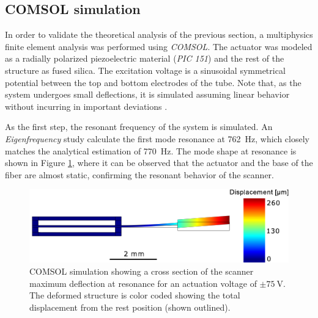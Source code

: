 \documentclass[10pt]{iopart}
\begin{document}
\subsection{COMSOL simulation}

In order to validate the theoretical analysis of the previous section, a multiphysics finite element analysis was performed using \textit{COMSOL}. The actuator was modeled as a radially polarized piezoelectric material (\textit{PIC 151}) and the rest of the structure as fused silica. The excitation voltage is a sinusoidal symmetrical potential between the top and bottom electrodes of the tube. Note that, as the system undergoes small deflections, it is simulated assuming linear behavior without incurring in important deviations \cite{Fertis2006}.

As the first step, the resonant frequency of the system is simulated. An \textit{Eigenfrequency} study calculate the first mode resonance at \SI{762}{\hertz}, which closely matches the analytical estimation of \SI{770}{\hertz}. The mode shape at resonance is shown in Figure \ref{fig:defle}, where it can be observed that the actuator and the base of the fiber are almost static, confirming the resonant behavior of the scanner.

\begin{figure}[h!]\centering
      \includegraphics[width=\columnwidth]{figures/deflection.pdf}
      \caption{COMSOL simulation showing a cross section of the scanner maximum deflection at resonance for an actuation voltage of $\pm \SI{75}{\volt}$. The deformed structure is color coded showing the total displacement from the rest position (shown outlined). }
      \label{fig:defle}
\end{figure}

\end{document}
